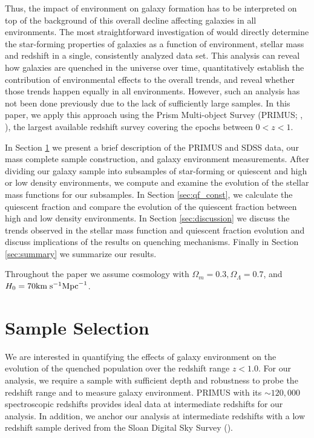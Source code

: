 \documentclass{emulateapj}
\begin{document}
Thus, the impact of environment on galaxy formation has to be
interpreted on top of the background of this overall decline affecting
galaxies in all environments.  The most straightforward investigation
of would directly determine the star-forming properties of galaxies as
a function of environment, stellar mass and redshift in a single,
consistently analyzed data set. This analysis can reveal how galaxies
are quenched in the universe over time, quantitatively establish the
contribution of environmental effects to the overall trends, and
reveal whether those trends happen equally in all environments.
However, such an analysis has not been done previously due to the lack
of sufficiently large samples. In this paper, we apply this approach
using the Prism Multi-object Survey (PRIMUS; \cite{Coil:2011aa}, 
\cite{Cool:2013aa}), the largest available redshift survey covering the epochs
between $0<z<1$.

In Section \ref{sec:sample} we present a brief description of the PRIMUS and SDSS data, our mass complete sample construction, and galaxy environment measurements. After dividing our galaxy sample into subsamples of star-forming or quiescent and high or low density environments, we compute and examine the evolution of the stellar mass functions for our subsamples. In Section \ref{sec:qf_const}, we calculate the quiescent fraction and compare the evolution of the quiescent fraction between high and low density environments. In Section \ref{sec:discussion} we discuss the trends observed in the stellar mass function and quiescent fraction evolution and discuss implications of the results on quenching mechanisms. Finally in Section \ref{sec:summary} we summarize our results. 

Throughout the paper we assume cosmology with $\Omega_{m} = 0.3, \Omega_{\Lambda} = 0.7$, and $H_0 = 70 \rm{km} \; \rm{s}^{-1} \rm{Mpc}^{-1}$.

\section{Sample Selection} \label{sec:sample}
We are interested in quantifying the effects of galaxy environment on the evolution of the quenched population over the redshift range $z < 1.0$. For our analysis, we require a sample with sufficient depth and robustness to probe the redshift range and to measure galaxy environment. PRIMUS with its $\sim 120,000$ spectroscopic redshifts provides ideal data at intermediate redshifts for our analysis. In addition, we anchor our analysis at intermediate redshifts with a low redshift sample derived from the Sloan Digital Sky Survey (\cite{York:2000aa}). 
\end{document}
